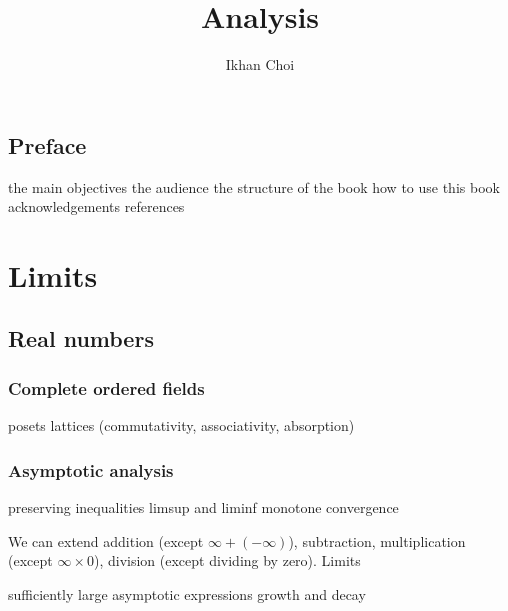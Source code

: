 \documentclass{../../large}
\begin{document}
\title{Analysis}
\author{Ikhan Choi}
\maketitle



\chapter*{Preface}
the main objectives
the audience
the structure of the book
how to use this book
acknowledgements
references


\tableofcontents


\part{Limits}
\chapter{Real numbers}
\section{Complete ordered fields}



posets
lattices (commutativity, associativity, absorption)











\section{Asymptotic analysis}

\begin{prb}
preserving inequalities
limsup and liminf
monotone convergence
\end{prb}

\begin{prb}
We can extend addition (except $\infty+(-\infty)$), subtraction, multiplication (except $\infty\times0$), division (except dividing by zero).
Limits
\end{prb}




sufficiently large
asymptotic expressions
growth and decay
\end{document}
